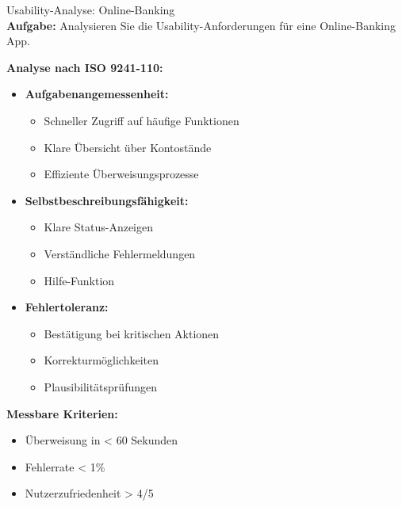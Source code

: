 \begin{example2}{Usability-Analyse: Online-Banking}\\
    \small
\textbf{Aufgabe:} Analysieren Sie die Usability-Anforderungen für eine Online-Banking App.

\textbf{Analyse nach ISO 9241-110:}
\begin{itemize}
    \item \textbf{Aufgabenangemessenheit:}
    \begin{itemize}
        \item Schneller Zugriff auf häufige Funktionen
        \item Klare Übersicht über Kontostände
        \item Effiziente Überweisungsprozesse
    \end{itemize}
    
    \item \textbf{Selbstbeschreibungsfähigkeit:}
    \begin{itemize}
        \item Klare Status-Anzeigen
        \item Verständliche Fehlermeldungen
        \item Hilfe-Funktion
    \end{itemize}
    
    \item \textbf{Fehlertoleranz:}
    \begin{itemize}
        \item Bestätigung bei kritischen Aktionen
        \item Korrekturmöglichkeiten
        \item Plausibilitätsprüfungen
    \end{itemize}
\end{itemize}

\textbf{Messbare Kriterien:}
\begin{itemize}
    \item Überweisung in < 60 Sekunden
    \item Fehlerrate < 1\%
    \item Nutzerzufriedenheit > 4/5
\end{itemize}
\end{example2}

